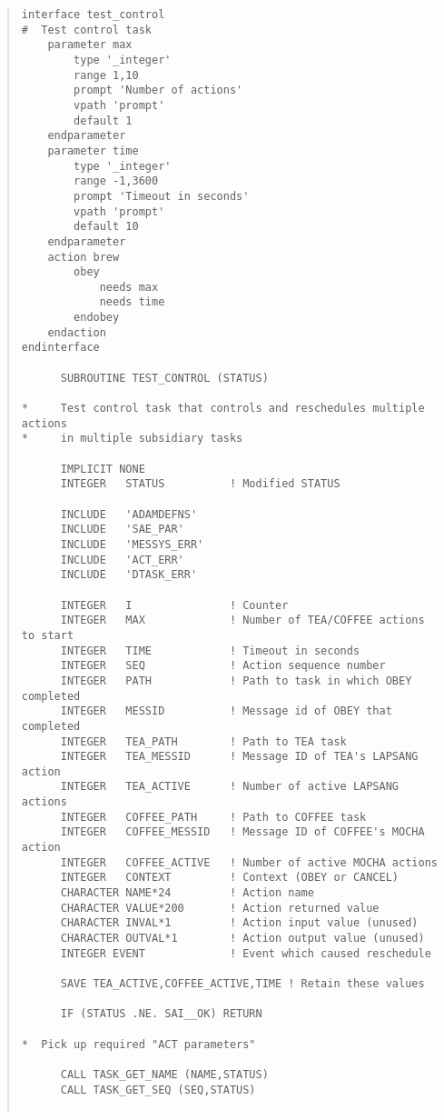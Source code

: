 \documentclass[twoside,11pt]{article}
\renewcommand{\_}{\texttt{\symbol{95}}}
\begin{document}
\small \begin{quote} \begin{verbatim}
interface test_control
#  Test control task
    parameter max
        type '_integer'
        range 1,10
        prompt 'Number of actions'
        vpath 'prompt'
        default 1
    endparameter
    parameter time
        type '_integer'
        range -1,3600
        prompt 'Timeout in seconds'
        vpath 'prompt'
        default 10
    endparameter
    action brew
        obey
            needs max
            needs time
        endobey
    endaction
endinterface

      SUBROUTINE TEST_CONTROL (STATUS)

*     Test control task that controls and reschedules multiple actions
*     in multiple subsidiary tasks

      IMPLICIT NONE
      INTEGER   STATUS          ! Modified STATUS
 
      INCLUDE   'ADAMDEFNS'
      INCLUDE   'SAE_PAR'
      INCLUDE   'MESSYS_ERR'
      INCLUDE   'ACT_ERR'
      INCLUDE   'DTASK_ERR'
 
      INTEGER   I               ! Counter
      INTEGER   MAX             ! Number of TEA/COFFEE actions to start
      INTEGER   TIME            ! Timeout in seconds
      INTEGER   SEQ             ! Action sequence number
      INTEGER   PATH            ! Path to task in which OBEY completed
      INTEGER   MESSID          ! Message id of OBEY that completed
      INTEGER   TEA_PATH        ! Path to TEA task
      INTEGER   TEA_MESSID      ! Message ID of TEA's LAPSANG action
      INTEGER   TEA_ACTIVE      ! Number of active LAPSANG actions
      INTEGER   COFFEE_PATH     ! Path to COFFEE task
      INTEGER   COFFEE_MESSID   ! Message ID of COFFEE's MOCHA action
      INTEGER   COFFEE_ACTIVE   ! Number of active MOCHA actions
      INTEGER   CONTEXT         ! Context (OBEY or CANCEL)
      CHARACTER NAME*24         ! Action name
      CHARACTER VALUE*200       ! Action returned value
      CHARACTER INVAL*1         ! Action input value (unused)
      CHARACTER OUTVAL*1        ! Action output value (unused)
      INTEGER EVENT             ! Event which caused reschedule

      SAVE TEA_ACTIVE,COFFEE_ACTIVE,TIME ! Retain these values
 
      IF (STATUS .NE. SAI__OK) RETURN

*  Pick up required "ACT parameters"

      CALL TASK_GET_NAME (NAME,STATUS)
      CALL TASK_GET_SEQ (SEQ,STATUS)


\end{verbatim}
\end{quote}
\end{document}

